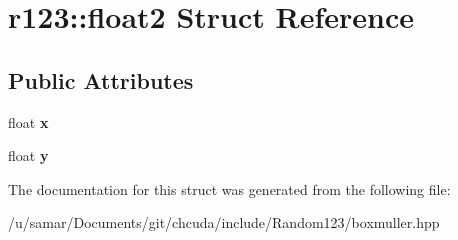 \hypertarget{structr123_1_1float2}{}\section{r123\+:\+:float2 Struct Reference}
\label{structr123_1_1float2}
\subsection*{Public Attributes}
\begin{DoxyCompactItemize}
\item 
\hypertarget{structr123_1_1float2_a18723e45509a339700c3847d2e12ee1c}{}\label{structr123_1_1float2_a18723e45509a339700c3847d2e12ee1c} 
float {\bfseries x}
\item 
\hypertarget{structr123_1_1float2_af51c599edf0494ba045e0cb088f86327}{}\label{structr123_1_1float2_af51c599edf0494ba045e0cb088f86327} 
float {\bfseries y}
\end{DoxyCompactItemize}


The documentation for this struct was generated from the following file\+:\begin{DoxyCompactItemize}
\item 
/u/samar/\+Documents/git/chcuda/include/\+Random123/boxmuller.\+hpp\end{DoxyCompactItemize}
